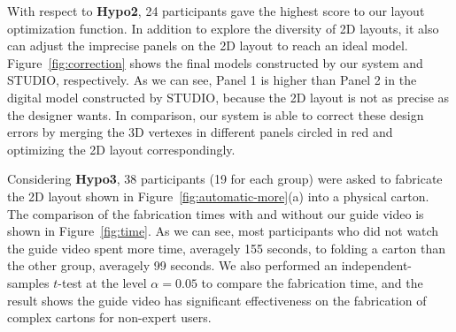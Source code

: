 With respect to \textbf{Hypo2}, 24 participants gave the highest score to our layout optimization function. 
%
In addition to explore the diversity of 2D layouts, it also can adjust the imprecise panels on the 2D layout to reach an ideal model. Figure~\ref{fig:correction} shows the final models constructed by our system and STUDIO, respectively. As we can see, Panel 1 is higher than Panel 2 in the digital model constructed by STUDIO, because the 2D layout is not as precise as the designer wants. 
%
In comparison, our system is able to correct these design errors by merging the 3D vertexes in different panels circled in red and optimizing the 2D layout correspondingly.


Considering \textbf{Hypo3}, 38 participants (19 for each group) were asked to fabricate the 2D layout shown in Figure~\ref{fig:automatic-more}(a) into a physical carton. 
The comparison of the fabrication times with and without our guide video is shown in Figure~\ref{fig:time}. 
As we can see, most participants who did not watch the guide video spent more time, averagely 155 seconds, to folding a carton than the other group, averagely 99 seconds.
% 
%
We also performed an independent-samples $t$-test at the level $\alpha = 0.05$ to compare the fabrication time, and the result shows the guide video has significant effectiveness on the fabrication of complex cartons for non-expert users.

